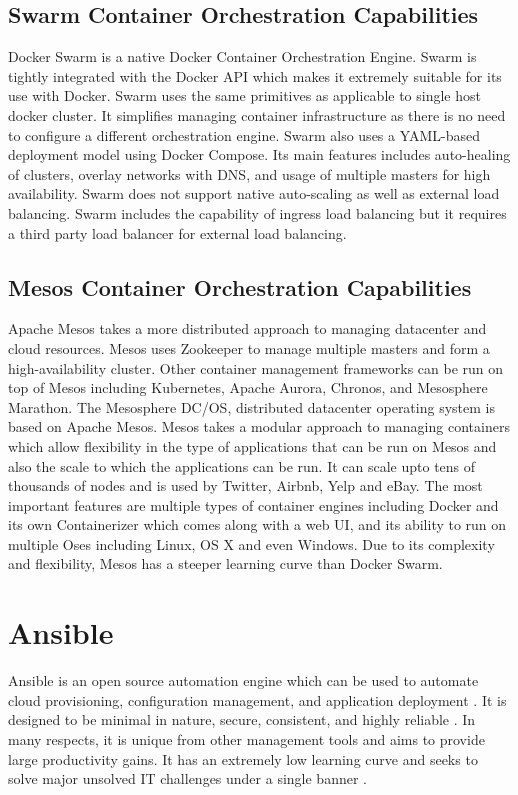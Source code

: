 \documentclass[9pt,twocolumn,twoside]{../../styles/osajnl}
\begin{document}
\subsection{Swarm Container Orchestration Capabilities}
Docker Swarm is a native Docker Container Orchestration Engine. Swarm
is tightly integrated with the Docker API which makes it extremely
suitable for its use with Docker. Swarm uses the same primitives as
applicable to single host docker cluster. It simplifies managing
container infrastructure as there is no need to configure a different
orchestration engine. Swarm also uses a YAML-based deployment model
using Docker Compose. Its main features includes auto-healing of
clusters, overlay networks with DNS, and usage of multiple masters for
high availability. Swarm does not support native auto-scaling as well
as external load balancing. Swarm includes the capability of ingress
load balancing but it requires a third party load balancer for
external load balancing.

\subsection{Mesos Container Orchestration Capabilities}
Apache Mesos takes a more distributed approach to managing datacenter
and cloud resources. Mesos uses Zookeeper to manage multiple masters
and form a high-availability cluster. Other container management
frameworks can be run on top of Mesos including Kubernetes, Apache
Aurora, Chronos, and Mesosphere Marathon. The Mesosphere DC/OS,
distributed datacenter operating system is based on Apache
Mesos. Mesos takes a modular approach to managing containers which
allow flexibility in the type of applications that can be run on
Mesos and also the scale to which the applications can be run. It
can scale upto tens of thousands of nodes and is used by Twitter, Airbnb,
Yelp and eBay. The most important features are multiple types of
container engines including Docker and its own Containerizer which
comes along with a web UI, and its ability to run on multiple Oses
including Linux, OS X and even Windows. Due to its complexity and
flexibility, Mesos has a steeper learning curve than Docker Swarm.

\section{Ansible}

Ansible is an open source automation engine which can be used to
automate cloud provisioning, configuration management, and application
deployment \cite{www-ansible-wikipedia}. It is designed to be minimal
in nature, secure, consistent, and highly reliable
\cite{www-ansible3}. In many respects, it is unique from other
management tools and aims to provide large productivity gains. It has
an extremely low learning curve and seeks to solve major unsolved IT
challenges under a single banner \cite{www-ansible-wikipedia}.
\end{document}
